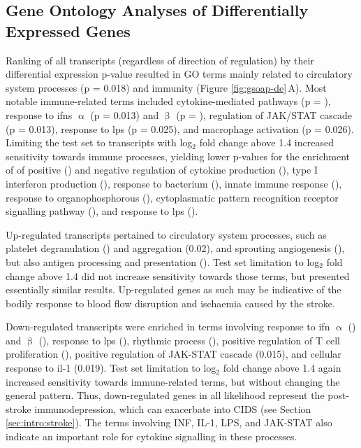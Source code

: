 \subsection{Gene Ontology Analyses of Differentially Expressed Genes} \label{sec:stroke:large-rna-go}
Ranking of all transcripts (regardless of direction of regulation) by their differential expression p-value resulted in GO terms mainly related to circulatory system processes (p = 0.018) and immunity (Figure \ref{fig:gsoap-de}\,A). Most notable immune-related terms included cytokine-mediated pathways (p = ), response to \acp{ifn} $\upalpha$ (p = 0.013) and $\upbeta$ (p = ), regulation of JAK/STAT cascade (p = 0.013), response to \ac{lps} (p = 0.025), and macrophage activation (p = 0.026). Limiting the test set to transcripts with log$_2$ fold change above 1.4\,\,increased sensitivity towards immune processes, yielding lower p-values for the enrichment of of positive () and negative regulation of cytokine production (), type I interferon production (), response to bacterium (), innate immune response (), response to organophosphorous (), cytoplasmatic pattern recognition receptor signalling pathway (), and response to \ac{lps} ().

Up-regulated transcripts pertained to circulatory system processes, such as platelet degranulation () and aggregation (0.02), and sprouting angiogenesis (), but also antigen processing and presentation (). Test set limitation to log$_2$ fold change above 1.4 did not increase sensitivity towards those terms, but presented essentially similar results. Up-regulated genes as such may be indicative of the bodily response to blood flow disruption and ischaemia caused by the stroke. 

Down-regulated transcripts were enriched in terms involving response to \ac{ifn} $\upalpha$ () and $\upbeta$ (), response to \ac{lps} (), rhythmic process (), positive regulation of T cell proliferation (), positive regulation of JAK-STAT cascade (0.015), and cellular response to \ac{il}-1 (0.019). Test set limitation to log$_2$ fold change above 1.4 again increased sensitivity towards immune-related terms, but without changing the general pattern. Thus, down-regulated genes in all likelihood represent the post-stroke immunodepression, which can exacerbate into CIDS (see Section \ref{sec:intro:stroke}). The terms involving INF, IL-1, LPS, and JAK-STAT also indicate an important role for cytokine signalling in these processes.

